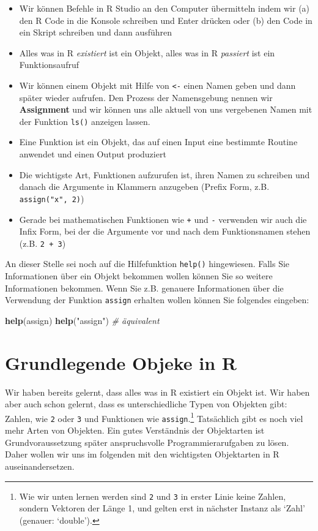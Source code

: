 \documentclass[]{tufte-book}
\newenvironment{Shaded}{}{}
\newcommand{\KeywordTok}[1]{\textcolor[rgb]{0.00,0.44,0.13}{\textbf{#1}}}
\newcommand{\StringTok}[1]{\textcolor[rgb]{0.25,0.44,0.63}{#1}}
\newcommand{\CommentTok}[1]{\textcolor[rgb]{0.38,0.63,0.69}{\textit{#1}}}
\newcommand{\NormalTok}[1]{#1}
\providecommand{\tightlist}{%
  \setlength{\itemsep}{0pt}\setlength{\parskip}{0pt}}
\begin{document}
\begin{itemize}
\tightlist
\item
  Wir können Befehle in R Studio an den Computer übermitteln indem wir
  (a) den R Code in die Konsole schreiben und Enter drücken oder (b) den
  Code in ein Skript schreiben und dann ausführen
\item
  Alles was in R \emph{existiert} ist ein Objekt, alles was in R
  \emph{passiert} ist ein Funktionsaufruf
\item
  Wir können einem Objekt mit Hilfe von \texttt{\textless{}-} einen
  Namen geben und dann später wieder aufrufen. Den Prozess der
  Namensgebung nennen wir \textbf{Assignment} und wir können uns alle
  aktuell von uns vergebenen Namen mit der Funktion \texttt{ls()}
  anzeigen lassen.
\item
  Eine Funktion ist ein Objekt, das auf einen Input eine bestimmte
  Routine anwendet und einen Output produziert
\item
  Die wichtigste Art, Funktionen aufzurufen ist, ihren Namen zu
  schreiben und danach die Argumente in Klammern anzugeben (Prefix Form,
  z.B. \texttt{assign("x",\ 2)})
\item
  Gerade bei mathematischen Funktionen wie \texttt{+} und \texttt{-}
  verwenden wir auch die Infix Form, bei der die Argumente vor und nach
  dem Funktionsnamen stehen (z.B. \texttt{2\ +\ 3})
\end{itemize}

An dieser Stelle sei noch auf die Hilfefunktion \texttt{help()}
hingewiesen. Falls Sie Informationen über ein Objekt bekommen wollen
können Sie so weitere Informationen bekommen. Wenn Sie z.B. genauere
Informationen über die Verwendung der Funktion \texttt{assign} erhalten
wollen können Sie folgendes eingeben:

\begin{Shaded}
\begin{Highlighting}[]
\KeywordTok{help}\NormalTok{(assign)}
\KeywordTok{help}\NormalTok{(}\StringTok{"assign"}\NormalTok{)  }\CommentTok{# äquivalent}
\end{Highlighting}
\end{Shaded}

\section{Grundlegende Objeke in R}\label{grundlegende-objeke-in-r}

Wir haben bereits gelernt, dass alles was in R existiert ein Objekt ist.
Wir haben aber auch schon gelernt, dass es unterschiedliche Typen von
Objekten gibt: Zahlen, wie \texttt{2} oder \texttt{3} und Funktionen wie
\texttt{assign}.\footnote{Wie wir unten lernen werden sind \texttt{2}
  und \texttt{3} in erster Linie keine Zahlen, sondern Vektoren der
  Länge 1, und gelten erst in nächster Instanz als `Zahl' (genauer:
  `double').} Tatsächlich gibt es noch viel mehr Arten von Objekten. Ein
gutes Verständnis der Objektarten ist Grundvoraussetzung später
anspruchsvolle Programmierarufgaben zu lösen. Daher wollen wir uns im
folgenden mit den wichtigsten Objektarten in R auseinandersetzen.
\end{document}
